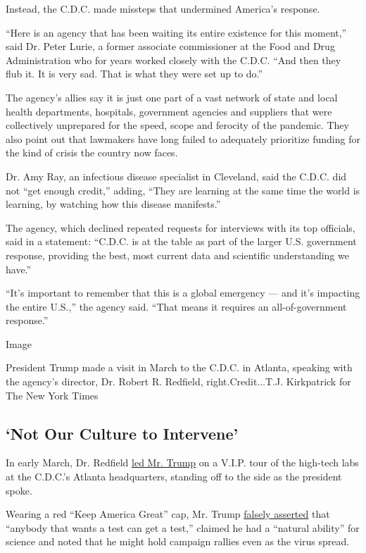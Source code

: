 Instead, the C.D.C. made missteps that undermined America's response.

``Here is an agency that has been waiting its entire existence for this
moment,'' said Dr. Peter Lurie, a former associate commissioner at the
Food and Drug Administration who for years worked closely with the
C.D.C. ``And then they flub it. It is very sad. That is what they were
set up to do.''

The agency's allies say it is just one part of a vast network of state
and local health departments, hospitals, government agencies and
suppliers that were collectively unprepared for the speed, scope and
ferocity of the pandemic. They also point out that lawmakers have long
failed to adequately prioritize funding for the kind of crisis the
country now faces.

Dr. Amy Ray, an infectious disease specialist in Cleveland, said the
C.D.C. did not ``get enough credit,'' adding, ``They are learning at the
same time the world is learning, by watching how this disease
manifests.''

The agency, which declined repeated requests for interviews with its top
officials, said in a statement: ``C.D.C. is at the table as part of the
larger U.S. government response, providing the best, most current data
and scientific understanding we have.''

``It's important to remember that this is a global emergency --- and
it's impacting the entire U.S.,'' the agency said. ``That means it
requires an all-of-government response.''

Image

President Trump made a visit in March to the C.D.C. in Atlanta, speaking
with the agency's director, Dr. Robert R. Redfield, right.Credit...T.J.
Kirkpatrick for The New York Times

\hypertarget{not-our-culture-to-intervene}{%
\subsection{`Not Our Culture to
Intervene'}\label{not-our-culture-to-intervene}}

In early March, Dr. Redfield
\href{https://www.nytimes3xbfgragh.onion/2020/03/06/us/politics/trump-coronavirus-cdc.html}{led
Mr. Trump} on a V.I.P. tour of the high-tech labs at the C.D.C.'s
Atlanta headquarters, standing off to the side as the president spoke.

Wearing a red ``Keep America Great'' cap, Mr. Trump
\href{https://www.whitehouse.gov/briefings-statements/remarks-president-trump-tour-centers-disease-control-prevention-atlanta-ga/}{falsely
asserted} that ``anybody that wants a test can get a test,'' claimed he
had a ``natural ability'' for science and noted that he might hold
campaign rallies even as the virus spread.

